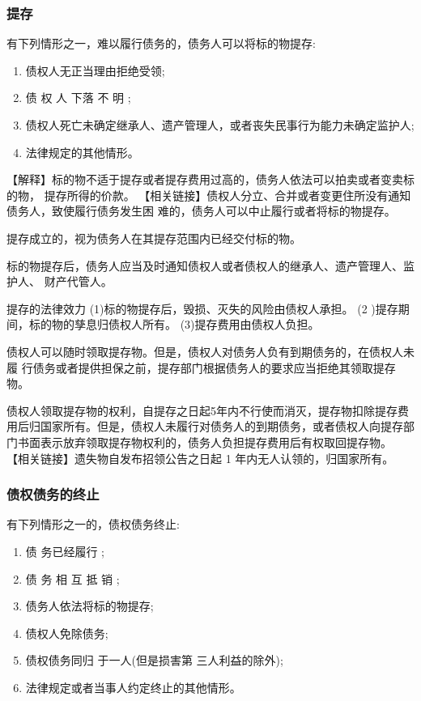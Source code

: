 \documentclass[UTF8,12pt]{ctexart}
\numberwithin{equation}{section} %
\numberwithin{figure}{section}
\numberwithin{table}{section}
\begin{document}
	\subsubsection{提存}
	有下列情形之一，难以履行债务的，债务人可以将标的物提存:
	\begin{enumerate}
		\item 债权人无正当理由拒绝受领;
		
		\item 债 权 人 下落 不 明 ;
		
		\item 债权人死亡未确定继承人、遗产管理人，或者丧失民事行为能力未确定监护人; 
		
		\item 法律规定的其他情形。
	\end{enumerate}
	【解释】标的物不适于提存或者提存费用过高的，债务人依法可以拍卖或者变卖标的物， 提存所得的价款。
	【相关链接】债权人分立、合并或者变更住所没有通知债务人，致使履行债务发生困 难的，债务人可以中止履行或者将标的物提存。
	
	提存成立的，视为债务人在其提存范围内已经交付标的物。
	
	标的物提存后，债务人应当及时通知债权人或者债权人的继承人、遗产管理人、监护人、 财产代管人。
	
	提存的法律效力
	(1)标的物提存后，毁损、灭失的风险由债权人承担。
	(2 )提存期间，标的物的孳息归债权人所有。
	(3)提存费用由债权人负担。
	
	债权人可以随时领取提存物。但是，债权人对债务人负有到期债务的，在债权人未履 行债务或者提供担保之前，提存部门根据债务人的要求应当拒绝其领取提存物。
	
	债权人领取提存物的权利，自提存之日起5年内不行使而消灭，提存物扣除提存费用后归国家所有。但是，债权人未履行对债务人的到期债务，或者债权人向提存部门书面表示放弃领取提存物权利的，债务人负担提存费用后有权取回提存物。 【相关链接】遗失物自发布招领公告之日起 1 年内无人认领的，归国家所有。
	
	\subsubsection{债权债务的终止}
	有下列情形之一的，债权债务终止:
	\begin{enumerate}
		\item 债 务已经履行 ;
		
		\item 债 务 相 互 抵 销 ;
		
		\item 债务人依法将标的物提存;
		
		\item 债权人免除债务;
		
		\item 债权债务同归 于一人(但是损害第 三人利益的除外);
		
		\item 法律规定或者当事人约定终止的其他情形。
	\end{enumerate}
	
\end{document}

